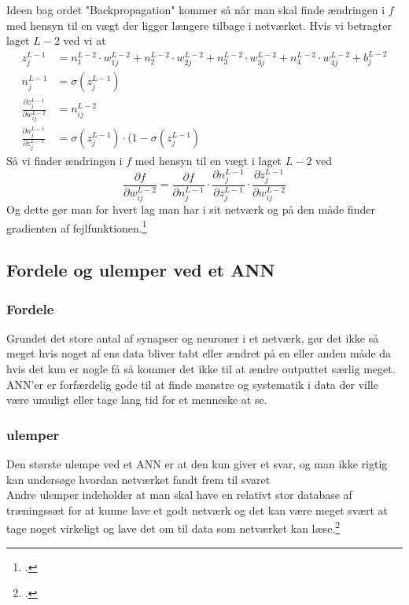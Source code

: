 Ideen bag ordet "Backpropagation" kommer så når man skal finde ændringen i $f$ med hensyn til en vægt der ligger længere tilbage i netværket. Hvis vi betragter laget $L-2$ ved vi at
\begin{align*}
        z^{L-1}_j & = n^{L-2}_1 \cdot w^{L-2}_{1j} + n^{L-2}_2 \cdot w^{L-2}_{2j} + n^{L-2}_3 \cdot w^{L-2}_{3j} + n^{L-2}_4 \cdot w^{L-2}_{4j} + b^{L-2}_j \\
        n^{L-1}_j & = \sigma (z^{L-1}_j) \\
        \frac{\partial z^{L-1}_j}{\partial w^{L-2}_{ij}} & = n^{L-2}_{ij} \\
        \frac{\partial n^{L-1}_j}{\partial z^{L-1}_{j}} & = \sigma (z^{L-1}_j) \cdot (1-\sigma (z^{L-1}_j)
\end{align*}
Så vi finder ændringen i $f$ med hensyn til en vægt i laget $L-2$ ved
$$\frac{\partial f}{\partial w^{L-2}_{ij}} = \frac{\partial f}{\partial n^{L-1}_j} \cdot \frac{\partial n^{L-1}_j}{\partial z^{L-1}_j} \cdot \frac{\partial z^{L-1}_j}{\partial w^{L-2}_{ij}}$$
Og dette gør man for hvert lag man har i sit netværk og på den måde finder gradienten af fejlfunktionen.\footcite{3b1b4}

\subsection{Fordele og ulemper ved et ANN}

\subsubsection{Fordele}

Grundet det store antal af synapser og neuroner i et netværk, gør det ikke så meget hvis noget af ens data bliver tabt eller ændret på en eller anden måde da hvis
det kun er nogle få så kommer det ikke til at ændre outputtet særlig meget.\\
ANN'er er forfærdelig gode til at finde mønstre og systematik i data der ville være umuligt eller tage lang tid for et menneske at se.

\subsubsection{ulemper}
Den største ulempe ved et ANN er at den kun giver et svar, og man ikke rigtig kan undersøge hvordan netværket fandt frem til svaret\\
Andre ulemper indeholder at man skal have en relativt stor database af træningssæt for at kunne lave et godt netværk og det kan være
meget svært at tage noget virkeligt og lave det om til data som netværket kan læse.\footcite{liann}
